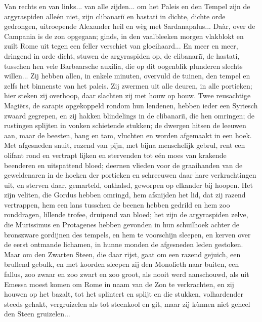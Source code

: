 \documentclass[a4paper, 12pt, oneside, dutch]{article}
\begin{document}
Van rechts en van links... van alle zijden... om het Paleis en den Tempel zijn de argyraspiden alleén niet, zijn clibanariï en hastati in dichte, dichte orde gedrongen, uitroepende Alexander heil en wèg met Sardanapalus... Daàr, over de Campania is de zon opgegaan; ginds, in den vaalbleeken morgen vlakblokt en zuilt Rome uit tegen een feller verschiet van gloeihaard... En meer en meer, dringend in orde dicht, stuwen de argyraspiden op, de clibanariï, de hastati, tusschen hen vele Barbaarsche auxilia, die op dit oogenblik plunderen slechts willen... Zij hebben allen, in enkele minuten, overvuld de tuinen, den tempel en zelfs het binnenste van het paleis. Zij zwermen uit alle deuren, in alle portieken; hier steken zij overhoop, daar slachten zij met houw op houw. Twee reusachtige Magiërs, de sarapis opgekoppeld rondom hun lendenen, hebben ieder een Syriesch zwaard gegrepen, en zij hakken blindelings in de clibanariï, die hen omringen; de rustingen splijten in vonken schietende stukken; de dwergen hitsen de leeuwen aan, maar de beesten, bang en tam, vluchten en worden afgemaakt in een hoek. Met afgesneden snuit, razend van pijn, met bijna menschelijk gebrul, rent een olifant rond en vertrapt lijken en stervenden tot eén moes van krakende beenderen en uitspattend bloed; deernen vlieden voor de graaihanden van de geweldenaren in de hoeken der portieken en schreeuwen daar hare verkrachtingen uit, en sterven daar, gemarteld, onthalsd, geworpen op elkander bij hoopen. Het zijn veliten, die Gordus hebben omringd, hem afsnijden het lid, dat zij razend vertrappen, hem een lans tusschen de beenen hebben gedrild en hem zoo ronddragen, lillende trofee, druipend van bloed; het zijn de argyraspiden zelve, die Murissimus en Protagenes hebben gevonden in hun schuilhoek achter de bronszware gordijnen des tempels, en hem te voorschijn sleepen, en kerven over de eerst ontmande lichamen, in hunne monden de afgesneden leden gestoken. Maar om den Zwarten Steen, die daar rijst, gaat om een razend gejuich, een brullend gebulk, en met koorden sleepen zij den Monolieth naar buiten, een fallus, zoo zwaar en zoo zwart en zoo groot, als nooit werd aanschouwd, als uit Emessa moest komen om Rome in naam van de Zon te verkrachten, en zij houwen op het bazalt, tot het splintert en splijt en die stukken, volhardender steeds gehakt, vergruizelen als tot steenkool en git, maar zij kùnnen niet geheel den Steen gruizelen...
\end{document}
